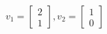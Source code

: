 \documentclass[preview]{standalone}
\begin{document}
\begin{align*}
v_1 = \begin{bmatrix} 2 \\ 1 \end{bmatrix} ,  v_2 = \begin{bmatrix} 1 \\ 0 \end{bmatrix}
\end{align*}
\end{document}

